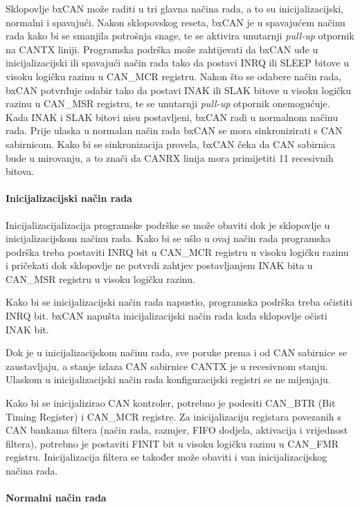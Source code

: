 Sklopovlje bxCAN može raditi u tri glavna načina rada, a to su inicijalizacijski, normalni i spavajući. Nakon sklopovskog reseta, bxCAN je u spavajućem načinu rada kako bi se smanjila potrošnja snage, te se aktivira unutarnji \textit{pull-up} otpornik na CANTX liniji. Programska podrška može zahtijevati da bxCAN uđe u inicijalizacijski ili spavajući način rada tako da postavi INRQ ili SLEEP bitove u visoku logičku razinu u CAN\_MCR registru. Nakon što se odabere način rada, bxCAN potvrđuje odabir tako da postavi INAK ili SLAK bitove u visoku logičku razinu u CAN\_MSR registru, te se unutarnji \textit{pull-up} otpornik onemogućuje. Kada INAK i SLAK bitovi nisu postavljeni, bxCAN radi u normalnom načinu rada. Prije ulaska u normalan način rada bxCAN se mora sinkronizirati s CAN sabirnicom. Kako bi se sinkronizacija provela, bxCAN čeka da CAN sabirnica bude u mirovanju, a to znači da CANRX linija mora primijetiti 11 recesivnih bitova.

\paragraph{Inicijalizacijski način rada}

Inicijalizacijalizacija programske podrške se može obaviti dok je sklopovlje u inicijalizacijskom načinu rada. Kako bi se ušlo u ovaj način rada programska podrška treba postaviti INRQ bit u CAN\_MCR registru u visoku logičku razinu i pričekati dok sklopovlje ne potvrdi zahtjev postavljanjem INAK bita u CAN\_MSR registru u visoku logičku razinu.

Kako bi se inicijalizacijski način rada napustio, programska podrška treba očistiti INRQ bit. bxCAN napušta inicijalizacijski način rada kada sklopovlje očisti INAK bit.

Dok je u inicijalizacijskom načinu rada, sve poruke prema i od CAN sabirnice se zaustavljaju, a stanje izlaza CAN sabirnice CANTX je u recesivnom stanju. Ulaskom u inicijalizacijski način rada konfiguracijski registri se ne mijenjaju.

Kako bi se inicijalizirao CAN kontroler, potrebno je podesiti CAN\_BTR \engl(Bit Timing Register) i CAN\_MCR registre. Za inicijalizaciju registara povezanih s CAN bankama filtera (način rada, razmjer, FIFO dodjela, aktivacija i vrijednost filtera), potrebno je postaviti FINIT bit u visoku logičku razinu u CAN\_FMR registru. Inicijalizacija filtera se također može obaviti i van inicijalizacijskog načina rada.

\paragraph{Normalni način rada}

